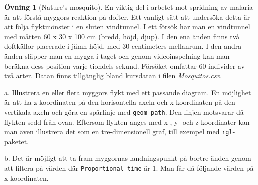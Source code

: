\documentclass[
]{book}
\theoremstyle{definition}
\theoremstyle{definition}
\theoremstyle{definition}
\newtheorem{exercise}{Övning}[chapter]
\theoremstyle{definition}
\theoremstyle{remark}
\begin{document}
\begin{exercise}[Nature's mosquito]
En viktig del i arbetet mot spridning av malaria är att förstå myggors reaktion på dofter. Ett vanligt sätt att undersöka detta är att följa flyktmönster i en sluten vindtunnel. I ett försök har man en vindtunnel med måtten 60 x 30 x 100 cm (bredd, höjd, djup). I den ena änden finns två doftkällor placerade i jämn höjd, med 30 centimeters mellanrum. I den andra änden släpper man en mygga i taget och genom videoinspelning kan man beräkna dess position varje tiondels sekund. Försöket omfattar 60 individer av två arter. Datan finns tillgänglig bland kursdatan i filen \emph{Mosquitos.csv}.

a. Illustrera en eller flera myggors flykt med ett passande diagram. En möjlighet är att ha z-koordinaten på den horisontella axeln och x-koordinaten på den vertikala axeln och göra en spårlinje med \texttt{geom\_path}. Den linjen motsvarar då flykten sedd från ovan. Eftersom flykten anges med x-, y- och z-koordinater kan man även illustrera det som en tre-dimensionell graf, till exempel med \texttt{rgl}-paketet.

b. Det är möjligt att ta fram myggornas landningspunkt på bortre änden genom att filtera på värden där \texttt{Proportional\_time} är 1. Man får då följande värden på x-koordinaten.


\end{exercise}
\end{document}
